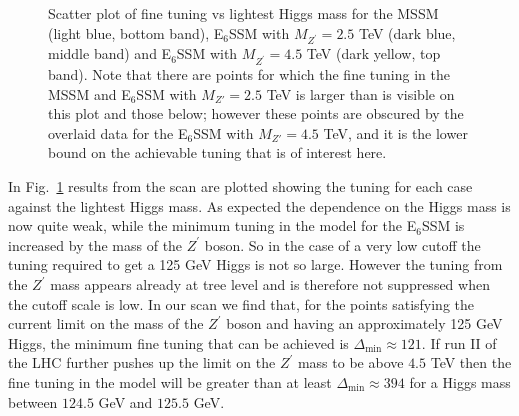 \documentclass[preprint,amsmath,amssymb,aps,superscriptaddress,prd,showpacs,floatfix,nofootinbib]{revtex4-1}
\begin{document}
\begin{figure}[h]
\begin{center}
\caption{Scatter plot of fine tuning vs lightest Higgs mass for the
  MSSM (light blue, bottom band), E$_6$SSM with $M_{Z^\prime} = 2.5$ TeV (dark blue, middle band) and
  E$_6$SSM with $M_{Z^\prime} = 4.5$ TeV (dark yellow, top band). Note that there are points for which
the fine tuning in the MSSM and E$_6$SSM with $M_{Z'}=2.5$ TeV is larger than is visible on this plot
and those below;
however these points are obscured by the overlaid data for the E$_6$SSM with $M_{Z'}=4.5$ TeV, and it is the 
lower bound on the achievable tuning that is of interest here.}
\label{Fig:e6ssmvsmssm}
\end{center}
\end{figure}
In Fig.~\ref{Fig:e6ssmvsmssm} results from the scan are plotted showing
the tuning for each case against the lightest Higgs mass.  As expected
the dependence on the Higgs mass is now quite weak, while the minimum
tuning in the model for the E$_6$SSM is increased by the mass of the
$Z^\prime$ boson.  So in the case of a very low cutoff the tuning
required to get a 125 GeV Higgs is not so large.  However the tuning
from the $Z^\prime$ mass appears already at tree level and is
therefore not suppressed when the cutoff scale is low. In our scan we
find that, for the points satisfying the current limit on the mass of
the $Z^\prime$ boson and having an approximately 125 GeV Higgs, the
minimum fine tuning that can be achieved is
$\Delta_{\textrm{min}}\approx 121$. If run II of the LHC further
pushes up the limit on the $Z^\prime$ mass to be above $4.5$ TeV then
the fine tuning in the model will be greater than at least
$\Delta_{\textrm{min}}\approx 394$ for a Higgs mass between $124.5$
GeV and $125.5$ GeV.
\end{document}
